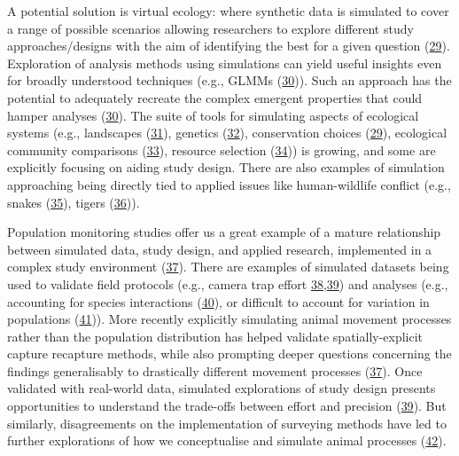 \documentclass[10pt,a4paper]{article}
\begin{document}
A potential solution is virtual ecology: where synthetic data is simulated to cover a range of possible scenarios allowing researchers to explore different study approaches/designs with the aim of identifying the best for a given question (\protect\hyperlink{ref-gupta_reserve_2019}{29}).
Exploration of analysis methods using simulations can yield useful insights even for broadly understood techniques (e.g., GLMMs (\protect\hyperlink{ref-debruine_understanding_2021}{30})).
Such an approach has the potential to adequately recreate the complex emergent properties that could hamper analyses (\protect\hyperlink{ref-debruine_understanding_2021}{30}).
The suite of tools for simulating aspects of ecological systems (e.g., landscapes (\protect\hyperlink{ref-Sciaini2018}{31}), genetics (\protect\hyperlink{ref-petr_slendr_2022}{32}), conservation choices (\protect\hyperlink{ref-gupta_reserve_2019}{29}), ecological community comparisons (\protect\hyperlink{ref-guerracastro_ssp_2021}{33}), resource selection (\protect\hyperlink{ref-street_solving_2021}{34})) is growing, and some are explicitly focusing on aiding study design.
There are also examples of simulation approaching being directly tied to applied issues like human-wildlife conflict (e.g., snakes (\protect\hyperlink{ref-goldstein_integrating_2021}{35}), tigers (\protect\hyperlink{ref-Ahearn2001}{36})).

Population monitoring studies offer us a great example of a mature relationship between simulated data, study design, and applied research, implemented in a complex study environment (\protect\hyperlink{ref-theng_confronting_2022}{37}).
There are examples of simulated datasets being used to validate field protocols (e.g., camera trap effort \protect\hyperlink{ref-howe_distance_2017}{38},\protect\hyperlink{ref-cappelle_estimating_2021}{39}) and analyses (e.g., accounting for species interactions (\protect\hyperlink{ref-kellner_two-species_2022}{40}), or difficult to account for variation in populations (\protect\hyperlink{ref-milleret_estimating_2022}{41})).
More recently explicitly simulating animal movement processes rather than the population distribution has helped validate spatially-explicit capture recapture methods, while also prompting deeper questions concerning the findings generalisably to drastically different movement processes (\protect\hyperlink{ref-theng_confronting_2022}{37}).
Once validated with real-world data, simulated explorations of study design presents opportunities to understand the trade-offs between effort and precision (\protect\hyperlink{ref-cappelle_estimating_2021}{39}).
But similarly, disagreements on the implementation of surveying methods have led to further explorations of how we conceptualise and simulate animal processes (\protect\hyperlink{ref-abolaffio_avoiding_2019}{42}).
\end{document}
